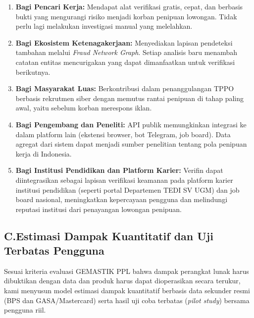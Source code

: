 \documentclass[12pt,a4paper]{article}
\begin{document}
\begin{enumerate}[label=\textbf{\arabic*.}]
\item \textbf{Bagi Pencari Kerja:} Mendapat alat verifikasi gratis, cepat, dan berbasis bukti yang
      mengurangi risiko menjadi korban penipuan lowongan. Tidak perlu lagi melakukan investigasi
      manual yang melelahkan.

\item \textbf{Bagi Ekosistem Ketenagakerjaan:} Menyediakan lapisan pendeteksi tambahan melalui
      \textit{Fraud Network Graph}. Setiap analisis baru menambah catatan entitas mencurigakan
      yang dapat dimanfaatkan untuk verifikasi berikutnya.

\item \textbf{Bagi Masyarakat Luas:} Berkontribusi dalam penanggulangan TPPO berbasis
      rekrutmen siber dengan memutus rantai penipuan di tahap paling awal, yaitu sebelum
      korban merespons iklan.

\item \textbf{Bagi Pengembang dan Peneliti:} API publik memungkinkan integrasi ke dalam platform
      lain (ekstensi browser, bot Telegram, job board). Data agregat dari sistem dapat menjadi
      sumber penelitian tentang pola penipuan kerja di Indonesia.

\item \textbf{Bagi Institusi Pendidikan dan Platform Karier:} Verifin dapat diintegrasikan sebagai
      lapisan verifikasi keamanan pada platform karier institusi pendidikan (seperti portal Departemen TEDI SV UGM) dan job board
      nasional, meningkatkan kepercayaan pengguna dan melindungi reputasi institusi dari
      penayangan lowongan penipuan.
\end{enumerate}

\subsection*{C.\quad Estimasi Dampak Kuantitatif dan Uji Terbatas Pengguna}
{}

Sesuai kriteria evaluasi GEMASTIK PPL bahwa dampak perangkat lunak harus dibuktikan dengan data
dan produk harus dapat dioperasikan secara terukur, kami menyusun model estimasi dampak kuantitatif
berbasis data sekunder resmi (BPS dan GASA/Mastercard) serta hasil uji coba terbatas (\textit{pilot study})
bersama pengguna riil.
\end{document}
